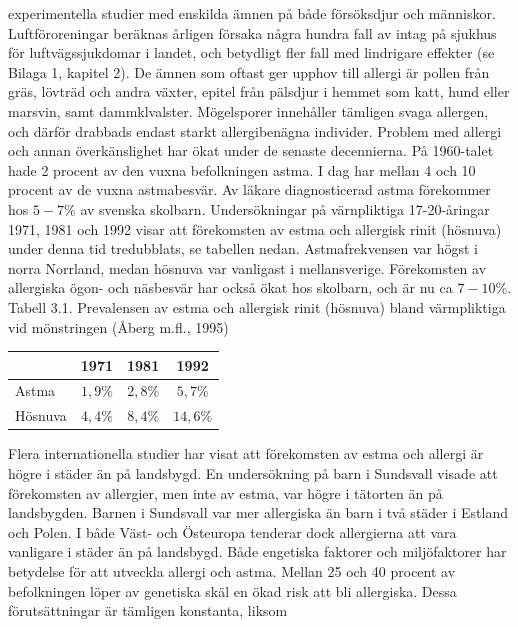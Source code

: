 experimentella studier med enskilda ämnen på både försöksdjur och människor. Luftföroreningar beräknas årligen försaka några hundra fall av intag på sjukhus för luftvägssjukdomar i landet, och betydligt fler fall med lindrigare effekter (se Bilaga 1, kapitel 2).
De ämnen som oftast ger upphov till allergi är pollen från gräs, lövträd och andra växter, epitel från pälsdjur i hemmet som katt, hund eller marsvin, samt dammklvalster. Mögelsporer innehåller tämligen svaga allergen, och därför drabbads endast starkt allergibenägna individer.
Problem med allergi och annan överkänslighet har ökat under de senaste decennierna. På 1960-talet hade 2 procent av den vuxna befolkningen astma. I dag har mellan 4 och 10 procent av de vuxna astmabesvär. Av läkare diagnosticerad astma förekommer hos \(5-7 \%\) av svenska skolbarn.
Undersökningar på värnpliktiga 17-20-åringar 1971, 1981 och 1992 visar att förekomsten av estma och allergisk rinit (hösnuva) under denna tid tredubblats, se tabellen nedan. Astmafrekvensen var högst i norra Norrland, medan hösnuva var vanligast i mellansverige. Förekomsten av allergiska ögon- och näsbesvär har också ökat hos skolbarn, och är nu ca \(7-10 \%\).
Tabell 3.1. Prevalensen av estma och allergisk rinit (hösnuva) bland värmpliktiga vid mönstringen (Åberg m.fl., 1995)
\begin{tabular}{lccc}
\hline & 1971 & 1981 & 1992 \\
\hline Astma & \(1,9 \%\) & \(2,8 \%\) & \(5,7 \%\) \\
Hösnuva & \(4,4 \%\) & \(8,4 \%\) & \(14,6 \%\) \\
\hline
\end{tabular}
Flera internationella studier har visat att förekomsten av estma och allergi är högre i städer än på landsbygd. En undersökning på barn i Sundsvall visade att förekomsten av allergier, men inte av estma, var högre i tätorten än på landsbygden. Barnen i Sundsvall var mer allergiska än barn i två städer i Estland och Polen. I både Väst- och Östeuropa tenderar dock allergierna att vara vanligare i städer än på landsbygd.
Både engetiska faktorer och miljöfaktorer har betydelse för att utveckla allergi och astma. Mellan 25 och 40 procent av befolkningen löper av genetiska skäl en ökad risk att bli allergiska. Dessa förutsättningar är tämligen konstanta, liksom

